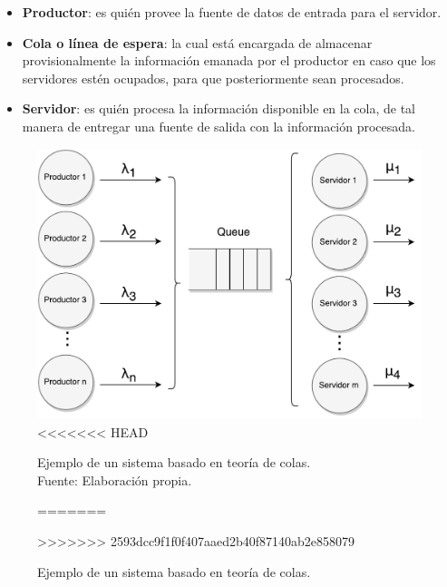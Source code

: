 \begin{itemize}
	\item \textbf{Productor}: es qui\'en provee la fuente de datos de entrada para el servidor.
	\item \textbf{Cola o l\'inea de espera}: la cual est\'a encargada de almacenar provisionalmente la informaci\'on emanada por el productor en caso que los servidores est\'en ocupados, para que posteriormente sean procesados.
	\item \textbf{Servidor}: es qui\'en procesa la informaci\'on disponible en la cola, de tal manera de entregar una fuente de salida con la informaci\'on procesada.
\end{itemize}

\begin{figure}[!ht]
	\centering
	\includegraphics[scale=0.6]{images/TeoriaColas.pdf}
<<<<<<< HEAD
	\caption[Ejemplo de un sistema basado en teoría de colas.]{Ejemplo de un sistema basado en teoría de colas.\\Fuente: Elaboración propia.}
=======
	\caption{Ejemplo de un sistema basado en teor\'ia de colas.}
>>>>>>> 2593dcc9f1f0f407aaed2b40f87140ab2e858079
	\label{fig:teoriaColas}
\end{figure}

